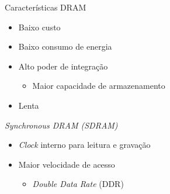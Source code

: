 \documentclass[aspectratio=169,
				xcolor=table]{beamer}
\begin{document}
	\begin{frame}{Características DRAM}
		\begin{itemize}
			\item Baixo custo
			\vspace{1em}
			\item Baixo consumo de energia
			\vspace{1em}
			\item Alto poder de integração
			\begin{itemize}
				\item Maior capacidade de armazenamento
			\end{itemize}
			\vspace{1em}
			\item Lenta
		\end{itemize}
	\end{frame}
	
	\begin{frame}{\textit{\textit{Synchronous} DRAM (SDRAM)}}
		\begin{itemize}
			\item \textit{Clock} interno para leitura e gravação
			\vspace{1em}
			\item Maior velocidade de acesso
			\begin{itemize}
				\item \textit{Double Data Rate} (DDR)
			\end{itemize}

		\end{itemize}
	\end{frame}
	
\end{document}
